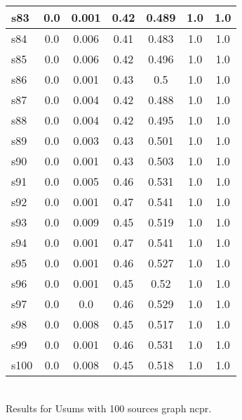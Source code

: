 \documentclass{article}
\begin{document}
\begin{tabular}{|l|c|c|c|c|c|c|}
\hline
s83 &0.0 & 0.001 & 0.42 & 0.489 & 1.0 & 1.0\\
\hline
s84 &0.0 & 0.006 & 0.41 & 0.483 & 1.0 & 1.0\\
\hline
s85 &0.0 & 0.006 & 0.42 & 0.496 & 1.0 & 1.0\\
\hline
s86 &0.0 & 0.001 & 0.43 & 0.5 & 1.0 & 1.0\\
\hline
s87 &0.0 & 0.004 & 0.42 & 0.488 & 1.0 & 1.0\\
\hline
s88 &0.0 & 0.004 & 0.42 & 0.495 & 1.0 & 1.0\\
\hline
s89 &0.0 & 0.003 & 0.43 & 0.501 & 1.0 & 1.0\\
\hline
s90 &0.0 & 0.001 & 0.43 & 0.503 & 1.0 & 1.0\\
\hline
s91 &0.0 & 0.005 & 0.46 & 0.531 & 1.0 & 1.0\\
\hline
s92 &0.0 & 0.001 & 0.47 & 0.541 & 1.0 & 1.0\\
\hline
s93 &0.0 & 0.009 & 0.45 & 0.519 & 1.0 & 1.0\\
\hline
s94 &0.0 & 0.001 & 0.47 & 0.541 & 1.0 & 1.0\\
\hline
s95 &0.0 & 0.001 & 0.46 & 0.527 & 1.0 & 1.0\\
\hline
s96 &0.0 & 0.001 & 0.45 & 0.52 & 1.0 & 1.0\\
\hline
s97 &0.0 & 0.0 & 0.46 & 0.529 & 1.0 & 1.0\\
\hline
s98 &0.0 & 0.008 & 0.45 & 0.517 & 1.0 & 1.0\\
\hline
s99 &0.0 & 0.001 & 0.46 & 0.531 & 1.0 & 1.0\\
\hline
s100 &0.0 & 0.008 & 0.45 & 0.518 & 1.0 & 1.0\\
\hline
\end{tabular}\\

\noindent Results for Usums with 100 sources graph ncpr.
\end{document}
